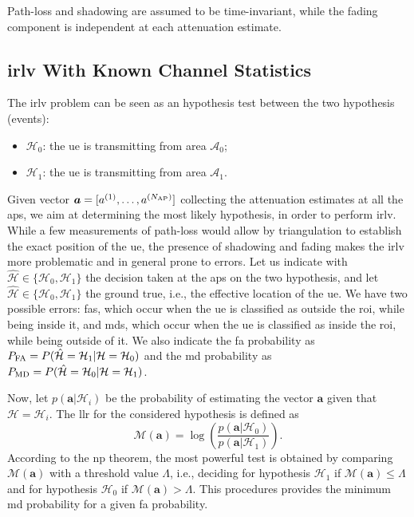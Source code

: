 \documentclass[draftcls,onecolumn,12pt]{IEEEtran}
\begin{document}
Path-loss and shadowing are assumed to be time-invariant, while the fading component is independent at each attenuation estimate. 

\subsection{\ac{irlv} With Known Channel Statistics}\label{sec:auth}

The \ac{irlv} problem can be seen as an hypothesis test between the two hypothesis (events):
\begin{itemize}
    \item $\mathcal{H}_0$: the \ac{ue} is transmitting from area $\mathcal{A}_0$;
    \item $\mathcal{H}_1$: the \ac{ue} is transmitting from area $\mathcal{A}_1$.
\end{itemize}
Given vector $\bm{a} = [a^{(1)}, \ldots, a^{(N_{\rm AP})}]$ collecting the attenuation estimates at all the \acp{ap}, we aim  at determining the most likely hypothesis, in order to perform  \ac{irlv}. While a few measurements of path-loss would allow by triangulation to establish the exact position of the \ac{ue}, the presence of shadowing and fading makes the \ac{irlv} more problematic and in general prone to errors. Let us indicate with $\hat{\mathcal H} \in  \{\mathcal{H}_0, \mathcal{H}_1\}$ the decision taken at the \acp{ap} on the two hypothesis, and let $\hat{\mathcal H} \in  \{\mathcal{H}_0, \mathcal{H}_1\}$ the ground true, i.e., the effective location of the \ac{ue}. We have two possible errors: \acp{fa}, which occur when the \ac{ue}  is classified as outside the \ac{roi}, while being inside it, and \acp{md}, which occur when the \ac{ue}  is classified as inside the \ac{roi}, while being outside of it. We also indicate the \ac{fa} probability  as $P_{\rm FA} =P(\hat{\mathcal H} = \mathcal H_1 | \mathcal H = \mathcal H_0)$ and the \ac{md} probability as $P_{\rm MD}=P(\hat{\mathcal H} = \mathcal H_0 | \mathcal H = \mathcal H_1)$.

Now, let  $p(\bm{a}|\mathcal{H}_i)$ be the probability of estimating the vector $\bm{a}$ given that  $\mathcal{H} = \mathcal{H}_i$. The \ac{llr} for the considered hypothesis is defined as 
\begin{equation}\label{eq:lr}
    {\mathcal M}(\bm{a})=\log\left(\frac{p(\bm{a}|\mathcal{H}_0)}{p(\bm{a}|\mathcal{H}_1)}\right).
\end{equation}
According to the \ac{np} theorem, the most powerful test is obtained by comparing $\mathcal{M}(\bm{a})$ with a threshold value $\Lambda$, i.e., deciding for hypothesis $\mathcal{H}_1$ if $\mathcal{M}(\bm{a}) \le \Lambda$ and for hypothesis $\mathcal{H}_0$ if $\mathcal{M}(\bm{a}) > \Lambda$. This procedures  provides the minimum \ac{md} probability for a given  \ac{fa} probability.
\end{document}
